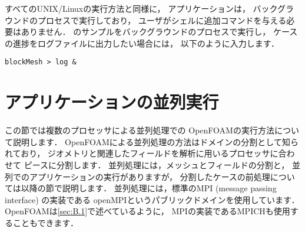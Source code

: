 すべてのUNIX/Linuxの実行方法と同様に，
アプリケーションは，
%
%
バックグラウンドのプロセスで実行しており，
ユーザがシェルに追加コマンドを与える必要はありません．
のサンプルをバックグラウンドのプロセスで実行し，
ケースの進捗をログファイルに出力したい場合には，
以下のように入力します．
\begin{OFterminal}
\begin{verbatim}
blockMesh > log &
\end{verbatim}
\end{OFterminal}



\section{アプリケーションの並列実行}
\label{sec:3.4}
%
%
この節では複数のプロセッサによる並列処理での
OpenFOAMの実行方法について説明します．
OpenFOAMによる並列処理の方法はドメインの分割として知られており，
ジオメトリと関連したフィールドを解析に用いるプロセッサに合わせて
ピースに分割します．
並列処理には，メッシュとフィールドの分割と，
並列でのアプリケーションの実行がありますが，
分割したケースの前処理については以降の節で説明します．
並列処理には，標準のMPI (message passing interface) の実装である
openMPIというパブリックドメインを使用しています．
OpenFOAMは\autoref{sec:B.1}で述べているように，
MPIの実装であるMPICHも使用することもできます．


